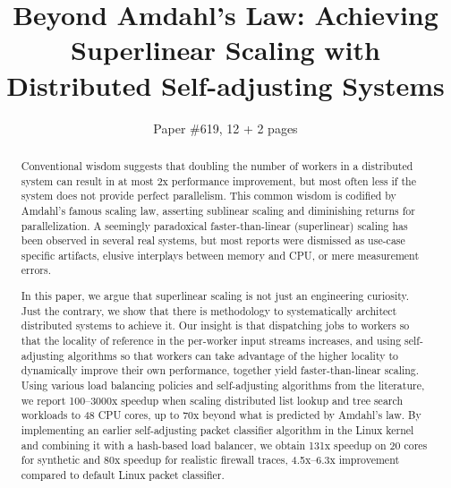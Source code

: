\documentclass[letterpaper,twocolumn,10pt]{article}
\begin{document}


\title{Beyond Amdahl's Law: Achieving Superlinear Scaling with\\Distributed Self-adjusting Systems}

\author{Paper \#619, 12 + 2 pages}

\maketitle

\begin{abstract}
  Conventional wisdom suggests that doubling the number of workers in a distributed system can result in at most 2x performance improvement, but most often less if the system does not provide perfect parallelism.  This common wisdom is codified by Amdahl's famous scaling law, asserting sublinear scaling and diminishing returns for parallelization. A seemingly paradoxical faster-than-linear (superlinear) scaling has been observed in several real systems, but most reports were dismissed as use-case specific artifacts, elusive interplays between memory and CPU, or mere measurement errors.

  In this paper, we argue that superlinear scaling is not just an engineering curiosity. Just the contrary, we show that there is methodology to systematically architect distributed systems to achieve it. Our insight is that dispatching jobs to workers so that the locality of reference in the per-worker input streams increases, and using self-adjusting algorithms so that workers can take advantage of the higher locality to dynamically improve their own performance, together yield faster-than-linear scaling. Using various load balancing policies and self-adjusting algorithms from the literature, we report 100--3000x speedup when scaling distributed list lookup and tree search workloads to 48 CPU cores, up to 70x beyond what is predicted by Amdahl's law.  %
  By implementing an earlier self-adjusting packet classifier algorithm in the Linux kernel and combining it with a hash-based load balancer, we obtain 131x speedup on 20 cores for synthetic and 80x speedup for realistic firewall traces, 4.5x--6.3x improvement compared to default Linux packet classifier.
\end{abstract}
\end{document}
